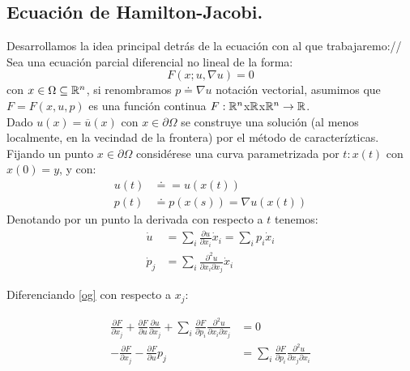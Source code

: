 \subsection{Ecuación de Hamilton-Jacobi.}
Desarrollamos la idea principal detr\'as de la ecuaci\'on con al que trabajaremo://
Sea una ecuaci\'on parcial diferencial no lineal \citep{evans} de la forma:
\begin{equation}\label{og}
	F(x;u,\nabla u)=0
\end{equation}
con $x\in\Omega\subseteq\mathbb{R}^n$, si renombramos $p\doteq\nabla u$ notaci\'on vectorial, asumimos que $F=F(x,u,p)$ es una funci\'on continua $F:\mathbb{R}^n$x$\mathbb{R}$x$\mathbb{R}^n \to \mathbb{R}$.\\
Dado $u(x)=\overline{u}(x)$ con $x\in\partial\Omega$ se construye una soluci\'on (al menos localmente, en la vecindad de la frontera) por el m\'etodo de caracter\'izticas.
Fijando un punto $x\in\partial\Omega$ consid\'erese una curva parametrizada por $t:x(t)$ con $x(0)=y$, y con:
\begin{equation*}
	\begin{split}
		u(t)&\doteq=u(x(t))\\
		p(t)&\doteq p(x(s))=\nabla u(x(t))
	\end{split}
\end{equation*}
Denotando por un punto la derivada con respecto a $t$ tenemos:
\begin{equation}\label{casi}
	\begin{split}
		\dot{u}&=\sum_i \frac{\partial u}{\partial x_i}\dot x_i=\sum_i p_i \dot x_i\\
		\dot p_j&=\sum_i \frac{\partial^2 u}{\partial x_i\partial x_j} \dot x_i
	\end{split}
\end{equation}

Diferenciando \eqref{og} con respecto a $x_j$:

\begin{equation*}
	\begin{split}
		\frac{\partial F}{\partial x_j}+\frac{\partial F}{\partial u}\frac{\partial u}{\partial x_j}+\sum_i \frac{\partial F}{\partial p_i}\frac{\partial^2 u}{\partial x_i\partial x_j}&=0\\
		-\frac{\partial F}{\partial x_j}-\frac{\partial F}{\partial u}p_j&=\sum_i \frac{\partial F}{\partial p_i}\frac{\partial^2 u}{\partial x_j\partial x_i}
	\end{split}
\end{equation*}

